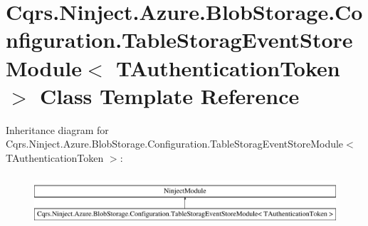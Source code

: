 \hypertarget{classCqrs_1_1Ninject_1_1Azure_1_1BlobStorage_1_1Configuration_1_1TableStoragEventStoreModule}{}\section{Cqrs.\+Ninject.\+Azure.\+Blob\+Storage.\+Configuration.\+Table\+Storag\+Event\+Store\+Module$<$ T\+Authentication\+Token $>$ Class Template Reference}
\label{classCqrs_1_1Ninject_1_1Azure_1_1BlobStorage_1_1Configuration_1_1TableStoragEventStoreModule}
Inheritance diagram for Cqrs.\+Ninject.\+Azure.\+Blob\+Storage.\+Configuration.\+Table\+Storag\+Event\+Store\+Module$<$ T\+Authentication\+Token $>$\+:\begin{figure}[H]
\begin{center}
\leavevmode
\includegraphics[height=1.863561cm]{classCqrs_1_1Ninject_1_1Azure_1_1BlobStorage_1_1Configuration_1_1TableStoragEventStoreModule}
\end{center}
\end{figure}
